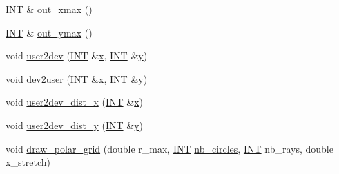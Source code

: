 \begin{DoxyCompactItemize}
\mbox{\hyperlink{galois_8h_a09fddde158a3a20bd2dcadb609de11dc}{I\+NT}} \& \mbox{\hyperlink{classmp__graphics_af0f66267f65077db72afeb0ce0b8df31}{out\+\_\+xmax}} ()
\item 
\mbox{\hyperlink{galois_8h_a09fddde158a3a20bd2dcadb609de11dc}{I\+NT}} \& \mbox{\hyperlink{classmp__graphics_a16d4b00f27d431c20c08840b6043cc7f}{out\+\_\+ymax}} ()
\item 
void \mbox{\hyperlink{classmp__graphics_af087f5f4b08c72f67f5e35cc312070fb}{user2dev}} (\mbox{\hyperlink{galois_8h_a09fddde158a3a20bd2dcadb609de11dc}{I\+NT}} \&\mbox{\hyperlink{alphabet2_8_c_a6150e0515f7202e2fb518f7206ed97dc}{x}}, \mbox{\hyperlink{galois_8h_a09fddde158a3a20bd2dcadb609de11dc}{I\+NT}} \&\mbox{\hyperlink{alphabet2_8_c_a0a2f84ed7838f07779ae24c5a9086d33}{y}})
\item 
void \mbox{\hyperlink{classmp__graphics_ad2f2f2f85200867d9ab52d1660e79bf1}{dev2user}} (\mbox{\hyperlink{galois_8h_a09fddde158a3a20bd2dcadb609de11dc}{I\+NT}} \&\mbox{\hyperlink{alphabet2_8_c_a6150e0515f7202e2fb518f7206ed97dc}{x}}, \mbox{\hyperlink{galois_8h_a09fddde158a3a20bd2dcadb609de11dc}{I\+NT}} \&\mbox{\hyperlink{alphabet2_8_c_a0a2f84ed7838f07779ae24c5a9086d33}{y}})
\item 
void \mbox{\hyperlink{classmp__graphics_a0c6b0bda2fbf3a7baa984eba08a87478}{user2dev\+\_\+dist\+\_\+x}} (\mbox{\hyperlink{galois_8h_a09fddde158a3a20bd2dcadb609de11dc}{I\+NT}} \&\mbox{\hyperlink{alphabet2_8_c_a6150e0515f7202e2fb518f7206ed97dc}{x}})
\item 
void \mbox{\hyperlink{classmp__graphics_acc9d05db077346e4fc8850bc80e9c96c}{user2dev\+\_\+dist\+\_\+y}} (\mbox{\hyperlink{galois_8h_a09fddde158a3a20bd2dcadb609de11dc}{I\+NT}} \&\mbox{\hyperlink{alphabet2_8_c_a0a2f84ed7838f07779ae24c5a9086d33}{y}})
\item 
void \mbox{\hyperlink{classmp__graphics_a6fddb7e055dd8099413f41489342fcff}{draw\+\_\+polar\+\_\+grid}} (double r\+\_\+max, \mbox{\hyperlink{galois_8h_a09fddde158a3a20bd2dcadb609de11dc}{I\+NT}} \mbox{\hyperlink{treedraw_8_c_ace75cd3f73244b9493fc59b1d888ee12}{nb\+\_\+circles}}, \mbox{\hyperlink{galois_8h_a09fddde158a3a20bd2dcadb609de11dc}{I\+NT}} nb\+\_\+rays, double x\+\_\+stretch)
\item 

\end{DoxyCompactItemize}

